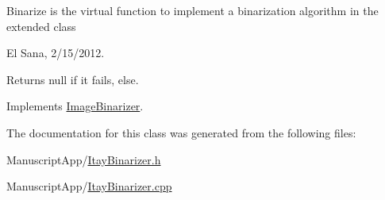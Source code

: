 Binarize is the virtual function to implement a binarization algorithm in the extended class 

El Sana, 2/15/2012. 

\begin{DoxyReturn}{Returns}
null if it fails, else. 
\end{DoxyReturn}


Implements \hyperlink{class_image_binarizer_accf059357ade25887a94c91f76262254}{Image\+Binarizer}.



The documentation for this class was generated from the following files\+:\begin{DoxyCompactItemize}
\item 
Manuscript\+App/\hyperlink{_itay_binarizer_8h}{Itay\+Binarizer.\+h}\item 
Manuscript\+App/\hyperlink{_itay_binarizer_8cpp}{Itay\+Binarizer.\+cpp}\end{DoxyCompactItemize}
